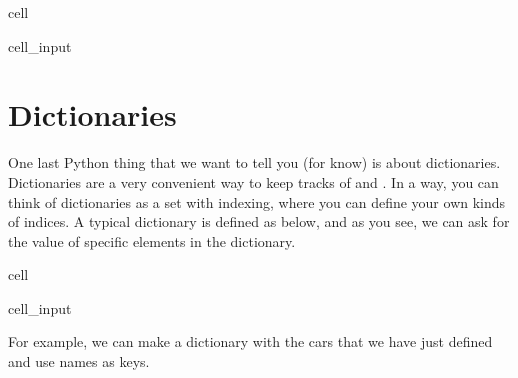 \documentclass[letterpaper,10pt,english]{jupyterBook}
\begin{document}
\begin{sphinxuseclass}{cell}\begin{sphinxVerbatimInput}

\begin{sphinxuseclass}{cell_input}
\begin{sphinxVerbatim}[commandchars=\\\{\}]
  
\end{sphinxVerbatim}

\end{sphinxuseclass}\end{sphinxVerbatimInput}

\end{sphinxuseclass}

\section{Dictionaries}
\label{\detokenize{notebooks/Tutorial1_NumpySimpleITK/Tutorial1_NumpySimpleITK_student:dictionaries}}
\sphinxAtStartPar
One last Python thing that we want to tell you (for know) is about dictionaries. Dictionaries are a very convenient way to keep tracks of  and . In a way, you can think of dictionaries as a set with indexing, where you can define your own kinds of indices. A typical dictionary is defined as below, and as you see, we can ask for the value of specific elements in the dictionary.

\begin{sphinxuseclass}{cell}\begin{sphinxVerbatimInput}

\begin{sphinxuseclass}{cell_input}
\begin{sphinxVerbatim}[commandchars=\\\{\}]
       
\PYG{p}{[}\PYG{p}{]}
\end{sphinxVerbatim}

\end{sphinxuseclass}\end{sphinxVerbatimInput}

\end{sphinxuseclass}
\sphinxAtStartPar
For example, we can make a dictionary with the cars that we have just defined and use names as keys.
\end{document}

